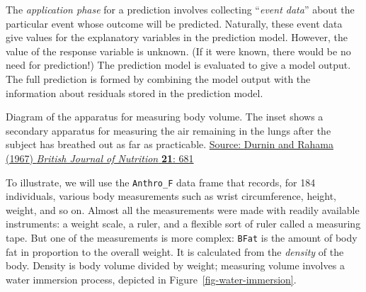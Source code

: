 \documentclass[
  letterpaper,
  DIV=11,
  numbers=noendperiod,
  oneside]{scrartcl}
\begin{document}
The \emph{application phase} for a prediction involves collecting
``\emph{event data}'' about the particular event whose outcome will be
predicted. Naturally, these event data give values for the explanatory
variables in the prediction model. However, the value of the response
variable is unknown. (If it were known, there would be no need for
prediction!) The prediction model is evaluated to give a model output.
The full prediction is formed by combining the model output with the
information about residuals stored in the prediction model.

\begin{marginfigure}


\caption{\label{fig-water-immersion}Diagram of the apparatus for
measuring body volume. The inset shows a secondary apparatus for
measuring the air remaining in the lungs after the subject has breathed
out as far as practicable.
\href{https://www.cambridge.org/core/services/aop-cambridge-core/content/view/DA80501B784742B9B2F4F454BDEE923B/S0007114567000728a.pdf/the-assessment-of-the-amount-of-fat-in-the-human-body-from-measurements-of-skinfold-thickness.pdf}{Source:
Durnin and Rahama (1967) \emph{British Journal of Nutrition}
\textbf{21}: 681}}

\end{marginfigure}%

To illustrate, we will use the \texttt{Anthro\_F} data frame that
records, for 184 individuals, various body measurements such as wrist
circumference, height, weight, and so on. Almost all the measurements
were made with readily available instruments: a weight scale, a ruler,
and a flexible sort of ruler called a measuring tape. But one of the
measurements is more complex: \texttt{BFat} is the amount of body fat in
proportion to the overall weight. It is calculated from the
\emph{density} of the body. Density is body volume divided by weight;
measuring volume involves a water immersion process, depicted in
Figure~\ref{fig-water-immersion}.
\end{document}
